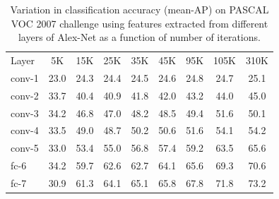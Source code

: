 \documentclass[runningheads]{llncs}
\begin{document}
\setlength{\tabcolsep}{4pt}
\begin{table}[t!]
\begin{center}
\caption{Variation in classification accuracy (mean-AP) on PASCAL VOC 2007 challenge using features extracted from different layers of Alex-Net as a function of number of iterations.}
\label{table:det-traj-classify}
\begin{tabular}{lcccccccc}
\hline\noalign{\smallskip}
Layer  & 5K & 15K & 25K & 35K & 45K & 95K & 105K & 310K \\
\noalign{\smallskip}
\hline
\noalign{\smallskip}
conv-1 & 23.0 & 24.3 & 24.4 & 24.5 & 24.6 & 24.8 & 24.7 & 25.1\\
conv-2 & 33.7 & 40.4 & 40.9 & 41.8 & 42.0 & 43.2 & 44.0 & 45.0\\
conv-3 & 34.2 & 46.8 & 47.0 & 48.2 & 48.5 & 49.4 & 51.6 & 50.1\\
conv-4 & 33.5 & 49.0 & 48.7 & 50.2 & 50.6 & 51.6 & 54.1 & 54.2\\
conv-5 & 33.0 & 53.4 & 55.0 & 56.8 & 57.4 & 59.2 & 63.5 & 65.6\\
fc-6 & 34.2 & 59.7 & 62.6 & 62.7 & 64.1 & 65.6 & 69.3 & 70.6\\
fc-7 & 30.9 & 61.3 & 64.1 & 65.1 & 65.8 & 67.8 & 71.8 & 73.2\\
\hline
\end{tabular}
\end{center}
\end{table}
\setlength{\tabcolsep}{1.4pt}
\end{document}
